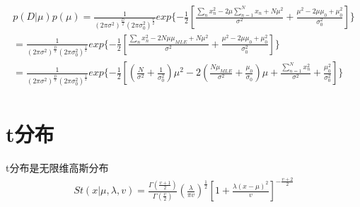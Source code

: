 \begin{equation}
\begin{aligned}
p(D|\mu)p(\mu)=
\frac{1}{(2\pi\sigma^2)^{\frac{D}{2}} (2\pi\sigma_0^2)^{\frac{1}{2}}}
exp\{  
-\frac{1}{2}
[\frac{\sum_nx_n^2-2\mu\sum_{n=1}^Nx_n +N\mu^2}{\sigma^2}
+ \frac{\mu^2-2\mu\mu_0+\mu_0^2}{\sigma_0^2}
]\} \\
=\frac{1}{(2\pi\sigma^2)^{\frac{D}{2}} (2\pi\sigma_0^2)^{\frac{1}{2}}}
exp\{  
-\frac{1}{2}
[\frac{\sum_nx_n^2-2N\mu\mu_{MLE} +N\mu^2}{\sigma^2}
+ \frac{\mu^2-2\mu\mu_0+\mu_0^2}{\sigma_0^2}
]\} \\
=\frac{1}{(2\pi\sigma^2)^{\frac{D}{2}} (2\pi\sigma_0^2)^{\frac{1}{2}}}
exp\{  
-\frac{1}{2}
[(\frac{N}{\sigma^2} + \frac{1}{\sigma_0^2})\mu^2
-2(\frac {N\mu_{MLE}} {\sigma^2} + \frac{\mu_0}{\sigma_0} )\mu
+ \frac {\sum_{n=1}^Nx_n^2} {\sigma^2} + \frac{\mu_0^2}{\sigma_0^2}
]\} \\
\end{aligned}
\end{equation}

\section{t分布}
t分布是无限维高斯分布
\begin{equation}
\begin{aligned}
St(x|\mu, \lambda, v) = 
\frac{\Gamma(\frac{v+1}{2})}{\Gamma(\frac{v}{2})}
(\frac{\lambda}{\pi v})^{\frac{1}{2}} 
[1 + \frac{\lambda(x-\mu)^2}{v}]^{-\frac{v+2}{2}}
\end{aligned}
\end{equation}
